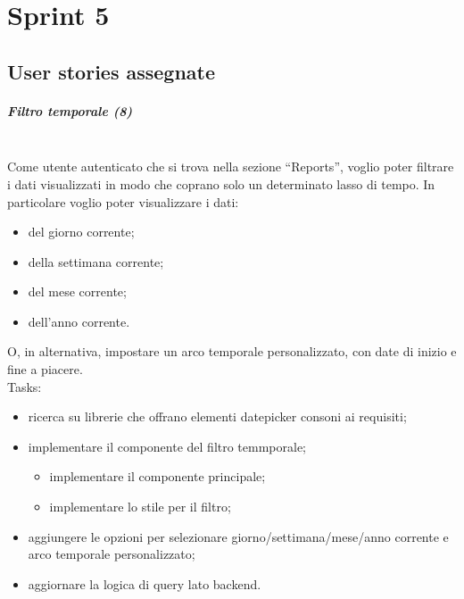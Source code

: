 
\chapter{Sprint 5}
\label{cap:sprint 5}

\section{User stories assegnate}
\paragraph{Filtro temporale (8)}\mbox{} \\[\baselineskip]
Come utente autenticato che si trova nella sezione “Reports”, voglio poter filtrare i dati visualizzati in modo che coprano solo un determinato lasso di tempo. In particolare voglio poter visualizzare i dati:
\begin{itemize}
  \item del giorno corrente;
  \item della settimana corrente;
  \item del mese corrente; 
  \item dell'anno corrente.
\end{itemize}
O, in alternativa, impostare un arco temporale personalizzato, con date di inizio e fine a piacere.\\

\noindent Tasks:
\begin{itemize}
  \item ricerca su librerie che offrano elementi datepicker consoni ai requisiti;
  \item implementare il componente del filtro temmporale;
  \begin{itemize}
    \item implementare il componente principale;
    \item implementare lo stile per il filtro;
  \end{itemize}
  \item aggiungere le opzioni per selezionare giorno/settimana/mese/anno corrente e arco temporale personalizzato;
  \item aggiornare la logica di query lato backend.
\end{itemize} 

